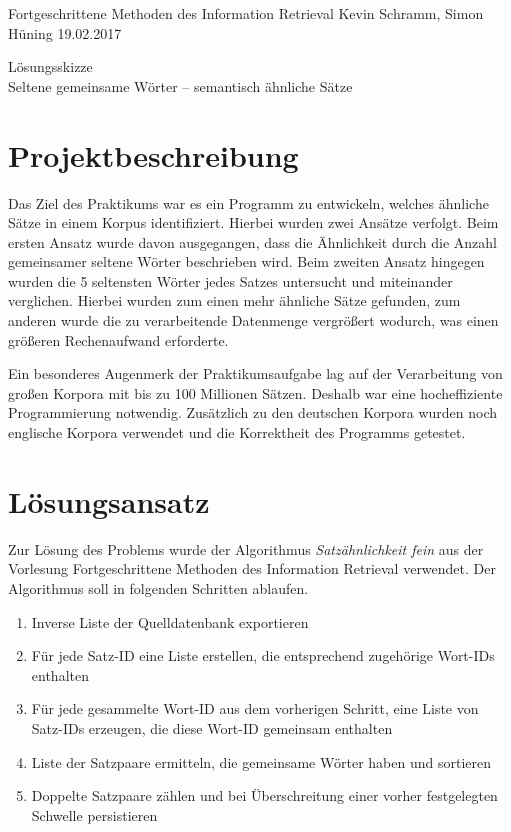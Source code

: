 \documentclass[a4paper,11pt,utf8]{scrartcl}
\begin{document}
\pagestyle{empty}

\noindent
Fortgeschrittene Methoden des Information Retrieval \hfill Kevin Schramm, Simon Hüning \hfill 19.02.2017\vspace{-.4cm}\\
\begin{center}
\huge\textsf{Lösungsskizze}\vspace{.1cm}\\
\large Seltene gemeinsame Wörter – semantisch ähnliche Sätze
\end{center}

\section{Projektbeschreibung}
Das Ziel des Praktikums war es ein Programm zu entwickeln, welches ähnliche Sätze in einem Korpus identifiziert. Hierbei wurden zwei Ansätze verfolgt. Beim ersten Ansatz wurde davon ausgegangen, dass die Ähnlichkeit durch die Anzahl gemeinsamer seltene Wörter beschrieben wird. Beim zweiten Ansatz hingegen wurden die 5 seltensten Wörter jedes Satzes untersucht und miteinander verglichen. Hierbei wurden zum einen mehr ähnliche Sätze gefunden, zum anderen wurde die zu verarbeitende Datenmenge vergrößert wodurch, was einen größeren Rechenaufwand erforderte. 

Ein besonderes Augenmerk der Praktikumsaufgabe lag auf der Verarbeitung von großen Korpora mit bis zu 100 Millionen Sätzen. Deshalb war eine hocheffiziente Programmierung notwendig. Zusätzlich zu den deutschen Korpora wurden noch englische Korpora verwendet und die Korrektheit des Programms getestet. 

\section{Lösungsansatz}
Zur Lösung des Problems wurde der Algorithmus \emph{Satzähnlichkeit fein} aus der Vorlesung Fortgeschrittene Methoden des Information Retrieval verwendet. Der Algorithmus soll in folgenden Schritten ablaufen.
\begin{enumerate}
	\item Inverse Liste der Quelldatenbank exportieren
	\item Für jede Satz-ID eine Liste erstellen, die entsprechend zugehörige Wort-IDs enthalten
	\item Für jede gesammelte Wort-ID aus dem vorherigen Schritt, eine Liste von Satz-IDs erzeugen, die diese Wort-ID gemeinsam enthalten
	\item Liste der Satzpaare ermitteln, die gemeinsame Wörter haben und sortieren
	\item Doppelte Satzpaare zählen und bei Überschreitung einer vorher festgelegten Schwelle persistieren
\end{enumerate}
\end{document}
